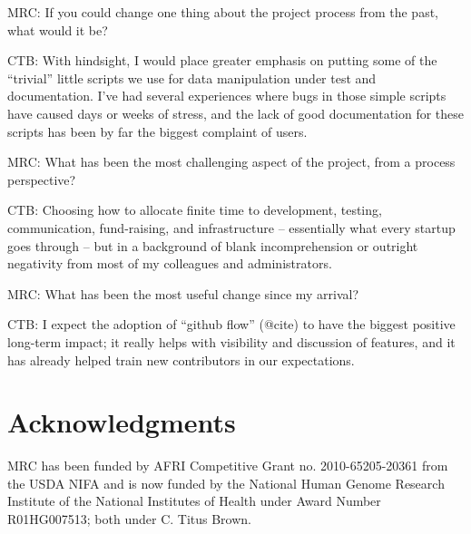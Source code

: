 \documentclass[11pt]{article}
\begin{document}
MRC: If you could change one thing about the project process from the
past, what would it be?

CTB: With hindsight, I would place greater emphasis on putting some of
the ``trivial'' little scripts we use for data manipulation under test
and documentation.  I've had several experiences where bugs in those
simple scripts have caused days or weeks of stress, and the lack of
good documentation for these scripts has been by far the biggest
complaint of users.

MRC: What has been the most challenging aspect of the project, from a
process perspective?

CTB: Choosing how to allocate finite time to development, testing,
communication, fund-raising, and infrastructure -- essentially what
every startup goes through -- but in a background of blank
incomprehension or outright negativity from most of my colleagues
and administrators.

MRC: What has been the most useful change since my arrival?

CTB: I expect the adoption of ``github flow'' (@cite) to have the biggest
positive long-term impact; it really helps with visibility and discussion
of features, and it has already helped train new contributors in our
expectations.



\section*{Acknowledgments}

MRC has been funded by AFRI Competitive Grant no. 2010-65205-20361
from the USDA NIFA and is now funded by the National Human Genome
Research Institute of the National Institutes of Health under Award
Number R01HG007513; both under C. Titus Brown.









\end{document}
